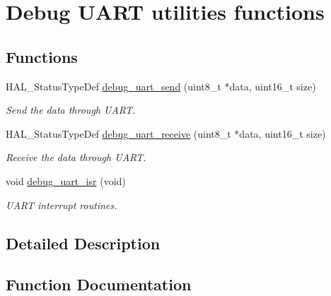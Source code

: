 \hypertarget{group___debug___uart___exported___functions___group2}{}\section{Debug U\+A\+RT utilities functions}
\label{group___debug___uart___exported___functions___group2}
\subsection*{Functions}
\begin{DoxyCompactItemize}
\item 
H\+A\+L\+\_\+\+Status\+Type\+Def \hyperlink{group___debug___uart___exported___functions___group2_ga3709c73faee84b7b9d4b9699a6035dfa}{debug\+\_\+uart\+\_\+send} (uint8\+\_\+t $\ast$data, uint16\+\_\+t size)
\begin{DoxyCompactList}\small\item\em Send the data through U\+A\+RT. \end{DoxyCompactList}\item 
H\+A\+L\+\_\+\+Status\+Type\+Def \hyperlink{group___debug___uart___exported___functions___group2_gae5a08803ab0c9fcbddfd2f8fbddb8a7e}{debug\+\_\+uart\+\_\+receive} (uint8\+\_\+t $\ast$data, uint16\+\_\+t size)
\begin{DoxyCompactList}\small\item\em Receive the data through U\+A\+RT. \end{DoxyCompactList}\item 
void \hyperlink{group___debug___uart___exported___functions___group2_ga7a880511e4fc8f2c3cad647324136dd3}{debug\+\_\+uart\+\_\+isr} (void)\hypertarget{group___debug___uart___exported___functions___group2_ga7a880511e4fc8f2c3cad647324136dd3}{}\label{group___debug___uart___exported___functions___group2_ga7a880511e4fc8f2c3cad647324136dd3}

\begin{DoxyCompactList}\small\item\em U\+A\+RT interrupt routines. \end{DoxyCompactList}\end{DoxyCompactItemize}


\subsection{Detailed Description}


\subsection{Function Documentation}
